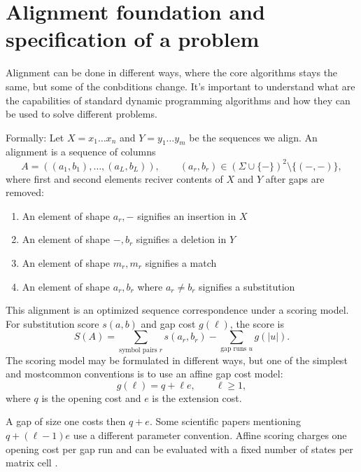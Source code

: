 
\section{Alignment foundation and specification of a problem}
\label{sec:alignment-model}

Alignment can be done in different ways, where the core algorithms stays the same, but some of the conbditions change.
It's important to understand what are the capabilities of standard dynamic programming algorithms and how they can be used to solve different problems.

Formally: Let \(X=x_1\ldots x_n\) and \(Y=y_1\ldots y_m\) be the sequences we align. 
An alignment is a sequence of columns
\[
  A=((a_1,b_1),\ldots,(a_L,b_L)),
  \qquad
  (a_r,b_r)\in(\Sigma\cup\{-\})^2\setminus\{(-,-)\},
\]
where first and second elements reciver contents of \(X\) and \(Y\) after gaps are removed:
\begin{enumerate}
\item An element of shape \(a_r, -\) signifies an insertion in \(X\)
\item An element of shape \(-, b_r\) signifies a deletion in \(Y\)
\item An element of shape \(m_r, m_r\) signifies a match
\item An element of shape \(a_r, b_r\) where \(a_r \neq b_r\) signifies a substitution
\end{enumerate}

This alignment is an optimized sequence correspondence under a scoring model.
For substitution score \(s(a,b)\) and gap cost \(g(\ell)\), the score is
\[
  S(A)=\sum_{\text{symbol pairs }r}s(a_r,b_r)
       -\sum_{\text{gap runs }u}g(|u|).
\]
The scoring model may be formulated in different ways, but one of the simplest and mostcommon conventions is to use an affine gap cost model:
\begin{equation}
  g(\ell)=q+\ell e,
  \qquad \ell\geq 1,
  \label{eq:affine-gap-convention}
\end{equation}
where \(q\) is the opening cost and \(e\) is the extension cost.

A gap of size one costs then \(q+e\). Some scientific papers mentioning \(q+(\ell-1)e\) use a different
parameter convention. Affine scoring charges one opening cost per gap run and
can be evaluated with a fixed number of states per matrix cell
\cite{gotoh_1982_affine}.

